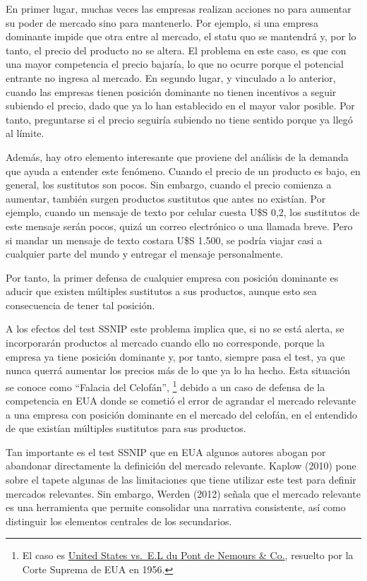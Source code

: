 \documentclass[
  12pt,
  spanish,
]{book}
\begin{document}
En primer lugar, muchas veces las empresas realizan acciones no para
aumentar su poder de mercado sino para mantenerlo. Por ejemplo, si una
empresa dominante impide que otra entre al mercado, el statu quo se
mantendrá y, por lo tanto, el precio del producto no se altera. El
problema en este caso, es que con una mayor competencia el precio
bajaría, lo que no ocurre porque el potencial entrante no ingresa al
mercado. En segundo lugar, y vinculado a lo anterior, cuando las
empresas tienen posición dominante no tienen incentivos a seguir
subiendo el precio, dado que ya lo han establecido en el mayor valor
posible. Por tanto, preguntarse si el precio seguiría subiendo no tiene
sentido porque ya llegó al límite.

Además, hay otro elemento interesante que proviene del análisis de la
demanda que ayuda a entender este fenómeno. Cuando el precio de un
producto es bajo, en general, los sustitutos son pocos. Sin embargo,
cuando el precio comienza a aumentar, también surgen productos
sustitutos que antes no existían. Por ejemplo, cuando un mensaje de
texto por celular cuesta U\$S 0,2, los sustitutos de este mensaje serán
pocos, quizá un correo electrónico o una llamada breve. Pero si mandar
un mensaje de texto costara U\$S 1.500, se podría viajar casi a
cualquier parte del mundo y entregar el mensaje personalmente.

Por tanto, la primer defensa de cualquier empresa con posición dominante
es aducir que existen múltiples sustitutos a sus productos, aunque esto
sea consecuencia de tener tal posición.

A los efectos del test SSNIP este problema implica que, si no se está
alerta, se incorporarán productos al mercado cuando ello no corresponde,
porque la empresa ya tiene posición dominante y, por tanto, siempre pasa
el test, ya que nunca querrá aumentar los precios más de lo que ya lo ha
hecho. Esta situación se conoce como ``Falacia del Celofán'', \footnote{El
  caso es
  \href{https://supreme.justia.com/cases/federal/us/351/377/}{United
  States vs.~E.L du Pont de Nemours \& Co.}, resuelto por la Corte
  Suprema de EUA en 1956.} debido a un caso de defensa de la competencia
en EUA donde se cometió el error de agrandar el mercado relevante a una
empresa con posición dominante en el mercado del celofán, en el
entendido de que existían múltiples sustitutos para sus productos.

Tan importante es el test SSNIP que en EUA algunos autores abogan por
abandonar directamente la definición del mercado relevante. Kaplow
(2010) pone sobre el tapete algunas de las limitaciones que tiene
utilizar este test para definir mercados relevantes. Sin embargo, Werden
(2012) señala que el mercado relevante es una herramienta que permite
consolidar una narrativa consistente, así como distinguir los elementos
centrales de los secundarios.
\end{document}
